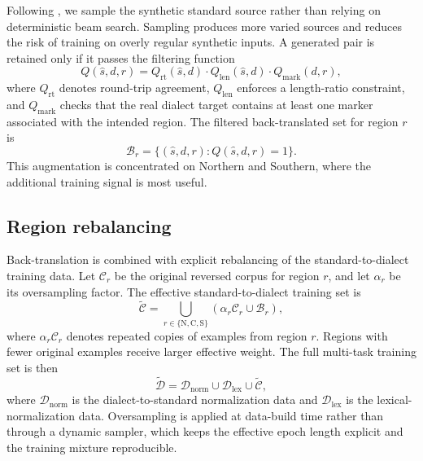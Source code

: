 \documentclass[11pt]{article}
\begin{document}
Following \citet{edunov2018understanding}, we sample the synthetic standard
source rather than relying on deterministic beam search. Sampling produces more
varied sources and reduces the risk of training on overly regular synthetic
inputs. A generated pair is retained only if it passes the filtering function
\begin{equation}
  Q(\hat{s},d,r)
  =
  Q_{\mathrm{rt}}(\hat{s},d)
  \cdot
  Q_{\mathrm{len}}(\hat{s},d)
  \cdot
  Q_{\mathrm{mark}}(d,r),
  \label{eq:bt-filter}
\end{equation}
where \(Q_{\mathrm{rt}}\) denotes round-trip agreement,
\(Q_{\mathrm{len}}\) enforces a length-ratio constraint, and
\(Q_{\mathrm{mark}}\) checks that the real dialect target contains at least one
marker associated with the intended region. The filtered back-translated set for
region \(r\) is
\begin{equation}
  \mathcal{B}_r
  =
  \{(\hat{s},d,r): Q(\hat{s},d,r)=1\}.
  \label{eq:bt-set}
\end{equation}
This augmentation is concentrated on Northern and Southern, where the additional
training signal is most useful.

\subsection{Region rebalancing}
\label{sec:method-rebalance}

Back-translation is combined with explicit rebalancing of the standard-to-dialect
training data. Let \(\mathcal{C}_r\) be the original reversed corpus for region
\(r\), and let \(\alpha_r\) be its oversampling factor. The effective
standard-to-dialect training set is
\begin{equation}
  \widetilde{\mathcal{C}}
  =
  \bigcup_{r\in\{\mathrm{N},\mathrm{C},\mathrm{S}\}}
  \left(
    \alpha_r \mathcal{C}_r
    \cup
    \mathcal{B}_r
  \right),
  \label{eq:rebalanced-corpus}
\end{equation}
where \(\alpha_r \mathcal{C}_r\) denotes repeated copies of examples from region
\(r\). Regions with fewer original examples receive larger effective weight. The
full multi-task training set is then
\begin{equation}
  \widetilde{\mathcal{D}}
  =
  \mathcal{D}_{\mathrm{norm}}
  \cup
  \mathcal{D}_{\mathrm{lex}}
  \cup
  \widetilde{\mathcal{C}},
  \label{eq:full-training-set}
\end{equation}
where \(\mathcal{D}_{\mathrm{norm}}\) is the dialect-to-standard normalization
data and \(\mathcal{D}_{\mathrm{lex}}\) is the lexical-normalization data.
Oversampling is applied at data-build time rather than through a dynamic sampler,
which keeps the effective epoch length explicit and the training mixture
reproducible.
\end{document}
